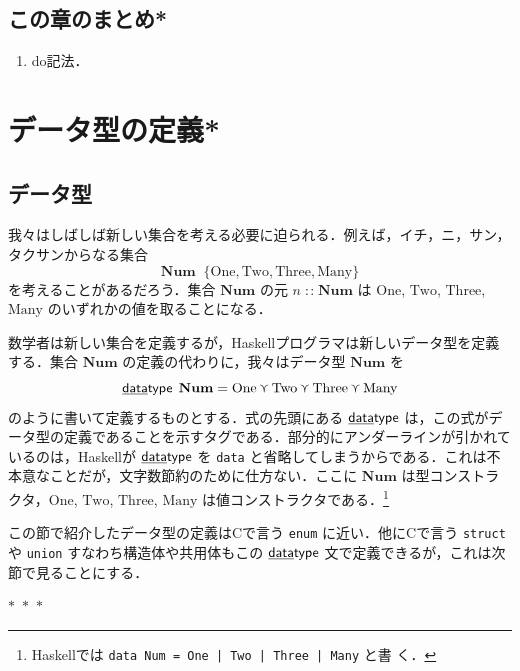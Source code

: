 \documentclass[a5paper,twoside,fleqn,draft]{jsbook}
\newcommand{\separator}{\begin{center}$*$~$*$~$*$\end{center}}
\newcommand{\programminglanguage}[1]{\textsf{#1}}
\newcommand{\clang}{\programminglanguage{C}}
\newcommand{\haskell}{\programminglanguage{Haskell}}
\newcommand{\keyword}[1]{{\underline{\textbf{#1}}}}
\newcommand{\code}[1]{\texttt{#1}}
\newcommand{\mKeyword}[1]{\mathsf{#1}}
\newcommand{\mKeywordUnderline}[1]{\text{\underline{\textsf{#1}}}}
\newcommand{\mDataTypeKeyword}{\mKeywordUnderline{data}\mKeyword{type}}
\DeclareMathOperator{\mDataType}{\mDataTypeKeyword}
\newcommand{\mSpecialConstant}[1]{\textrm{#1}}
\newcommand{\mNumOne}{\mSpecialConstant{One}}
\newcommand{\mNumTwo}{\mSpecialConstant{Two}}
\newcommand{\mNumThree}{\mSpecialConstant{Three}}
\newcommand{\mNumMany}{\mSpecialConstant{Many}}
\DeclareMathOperator{\mDefEq}{\stackrel{\mathrm{def}}{=}}
\DeclareMathOperator{\mIn}{{:\!:}}
\DeclareMathOperator{\mValueOr}{\curlyvee}
\newcommand{\mSet}[1]{\mathbf{#1}}
\newcommand{\mType}[1]{\mathbf{#1}} %
\begin{document}
\section{この章のまとめ*}

\begin{enumerate}
\item do記法．
\end{enumerate}

\chapter{データ型の定義*}
\label{ch:data-type}

\section{データ型}

我々はしばしば新しい集合を考える必要に迫られる．例えば，イチ，ニ，サン，タクサンからなる集合
\begin{equation}
\mSet{Num}\mDefEq\{\mNumOne,\mNumTwo,\mNumThree,\mNumMany\}
\end{equation}
を考えることがあるだろう．集合 $\mSet{Num}$ の元 $n\mIn\mSet{Num}$ は $\mNumOne$, $\mNumTwo$, $\mNumThree$, $\mNumMany$ のいずれかの値を取ることになる．

数学者は新しい集合を定義するが，\haskell プログラマは新しいデータ型を定義する．集合 $\mSet{Num}$ の定義の代わりに，我々はデータ型
$\mType{Num}$ を
\begin{equation}
  \mDataType\;\mType{Num}
  =\mNumOne\mValueOr\mNumTwo\mValueOr\mNumThree\mValueOr\mNumMany
\end{equation}
のように書いて定義するものとする．式の先頭にある $\mDataType$ は，この式がデータ型の定義であることを示すタグである．部分的にアンダーラインが引かれているのは，\haskell が $\mDataType$ を \code{data} と省略してしまうからである．これは不本意なことだが，文字数節約のために仕方ない．ここに $\mSet{Num}$ は型コンストラクタ，$\mNumOne$, $\mNumTwo$, $\mNumThree$, $\mNumMany$ は値コンストラクタである．\footnote{\haskell では \code{data Num = One | Two | Three | Many} と書
  く．}


この節で紹介したデータ型の定義は\clang で言う \code{enum} に近い．他に\clang で言う \code{struct} や \code{union} すなわち構造体や共用体もこの $\mDataType$ 文で定義できるが，これは次節で見ることにする．

\separator
\end{document}
